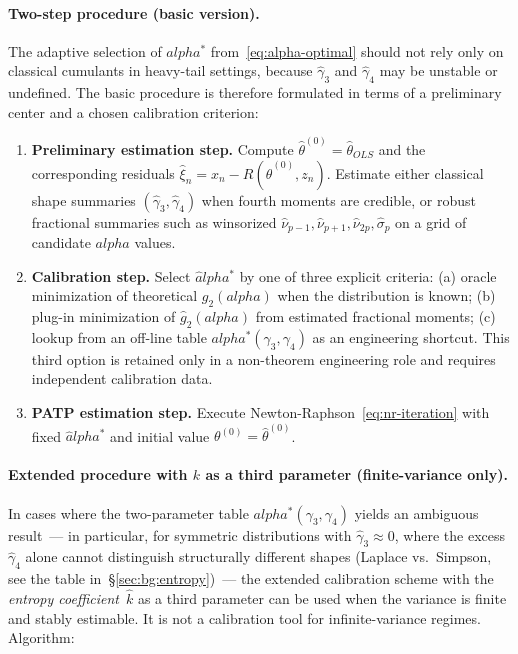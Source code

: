 \documentclass[11pt]{article}
\def\alpha{alpha}%
\def\mathrm#1{#1}%
\theoremstyle{definition}
\begin{document}
\paragraph{Two-step procedure (basic version).}
The adaptive selection of $\alpha^{*}$ from~\eqref{eq:alpha-optimal} should
not rely only on classical cumulants in heavy-tail settings, because
$\hat\gamma_3$ and $\hat\gamma_4$ may be unstable or undefined. The basic
procedure is therefore formulated in terms of a preliminary center and a
chosen calibration criterion:

\begin{enumerate}
  \item \textbf{Preliminary estimation step.} Compute
        $\hat\theta^{(0)} = \hat\theta_{\mathrm{OLS}}$ and the corresponding
        residuals $\hat\xi_n = x_n - R(\hat\theta^{(0)}, z_n)$.
        Estimate either classical shape summaries
        $(\hat\gamma_3,\hat\gamma_4)$ when fourth moments are credible, or
        robust fractional summaries such as winsorized
        $\hat\nu_{p-1},\hat\nu_{p+1},\hat\nu_{2p},\hat\sigma_p$ on a grid
        of candidate $\alpha$ values.
  \item \textbf{Calibration step.} Select $\hat\alpha^{*}$ by one of three
        explicit criteria:
        (a) oracle minimization of theoretical $g_2(\alpha)$ when the
        distribution is known;
	        (b) plug-in minimization of $\hat g_2(\alpha)$ from estimated
	        fractional moments;
	        (c) lookup from an off-line table
	        $\alpha^{*}(\gamma_3,\gamma_4)$ as an engineering shortcut.
	        This third option is retained only in a non-theorem engineering
	        role and requires independent calibration data.
  \item \textbf{PATP estimation step.} Execute Newton-Raphson~\eqref{eq:nr-iteration}
        with fixed $\hat\alpha^{*}$ and initial value
        $\theta^{(0)} = \hat\theta^{(0)}$.
\end{enumerate}

\paragraph{Extended procedure with $k$ as a third parameter (finite-variance only).}
In cases where the two-parameter table $\alpha^{*}(\gamma_3, \gamma_4)$
yields an ambiguous result~--- in particular, for symmetric distributions with
$\hat\gamma_3 \approx 0$, where the excess $\hat\gamma_4$ alone cannot
distinguish structurally different shapes (Laplace vs.\ Simpson, see the
table in~\S\ref{sec:bg:entropy})~--- the extended calibration scheme with
the \emph{entropy coefficient}~$\hat k$ as a third parameter can be used
when the variance is finite and stably estimable. It is not a calibration
tool for infinite-variance regimes.
Algorithm:
\end{document}
